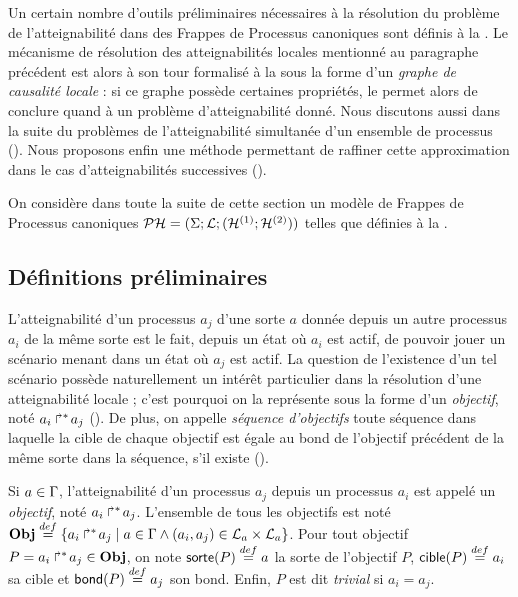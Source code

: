 Un certain nombre d'outils préliminaires nécessaires à la résolution du problème
de l'atteignabilité dans des Frappes de Processus canoniques sont
définis à la .
Le mécanisme de résolution des atteignabilités locales mentionné au paragraphe précédent
est alors à son tour formalisé
à la  sous la forme d'un \emph{graphe de causalité locale} :
si ce graphe possède certaines propriétés, le  permet alors de conclure
quand à un problème d'atteignabilité donné.
Nous discutons aussi dans la suite du problèmes de l'atteignabilité
simultanée d'un ensemble de processus ().
Nous proposons enfin une méthode permettant de raffiner cette approximation
dans le cas d'atteignabilités successives ().

On considère dans toute la suite de cette section un modèle de Frappes de Processus canoniques
$\mathcal{PH} = (\Sigma; \mathcal{L}; (\mathcal{H}^{(1)};\mathcal{H}^{(2)}))$
telles que définies à la .



\subsection{Définitions préliminaires}

L'atteignabilité d'un processus $a_j$ d'une sorte $a$ donnée depuis un autre processus $a_i$
de la même sorte est le fait, depuis un état où $a_i$ est actif,
de pouvoir jouer un scénario menant dans un état où $a_j$ est actif.
La question de l'existence d'un tel scénario possède naturellement un intérêt particulier
dans la résolution d'une atteignabilité locale ; c'est pourquoi on la représente
sous la forme d'un \emph{objectif}, noté $\mbox{${a}_{i}\Rsh^*\!{a}_{j}$}$ ().
De plus, on appelle \emph{séquence d'objectifs} toute séquence dans laquelle
la cible de chaque objectif est égale au bond de l'objectif précédent de la même sorte
dans la séquence, s'il existe ().

\begin{definition}
  Si $a \in \Gamma$, l'atteignabilité d'un processus $a_j$ depuis un processus $a_i$
  est appelé un \emph{objectif}, noté $\mbox{$a_i\Rsh^*\!a_j$}$.
  L'ensemble de tous les objectifs est noté
  $\mathbf{Obj} \stackrel{def}= \{ \mbox{$a_i\Rsh^*\!a_j$} \mid
    a \in \Gamma \wedge (a_i, a_j) \in \mathcal{L}_a \times \mathcal{L}_a \}$.
  Pour tout objectif $P = \mbox{$a_i\Rsh^*\!a_j$} \in \mathbf{Obj}$, on note
  $\mathsf{sorte}(P) \stackrel{def}= a$ la sorte de l'objectif $P$,
  $\mathsf{cible}(P) \stackrel{def}= a_i$ sa cible et $\mathsf{bond}(P) \stackrel{def}= a_j$ son bond.
  Enfin, $P$ est dit \emph{trivial} si $a_i = a_j$.
\end{definition}

